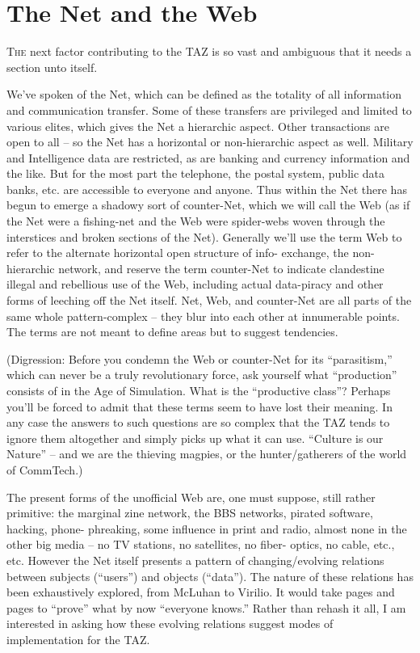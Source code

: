 \documentclass[a4paper,english,10pt,twoside]{article}
\begin{document}
\section{The Net and the Web}

\lettrine{T}{he} next factor contributing to the TAZ is so vast and ambiguous that it needs a section unto itself.

\medskip
We've spoken of the Net, which can be defined as the totality of all information and communication transfer. Some of these transfers are privileged and limited to various elites, which gives the Net a hierarchic aspect. Other transactions are open to all -- so the Net has a horizontal or non-hierarchic aspect as well. Military and Intelligence data are restricted, as are banking and currency information and the like. But for the most part the telephone, the postal system, public data banks, etc. are accessible to everyone and anyone. Thus within the Net there has begun to emerge a shadowy sort of counter-Net, which we will call the Web (as if the Net were a fishing-net and the Web were spider-webs woven through the interstices and broken sections of the Net). Generally we'll use the term Web to refer to the alternate horizontal open structure of info- exchange, the non-hierarchic network, and reserve the term counter-Net to indicate clandestine illegal and rebellious use of the Web, including actual data-piracy and other forms of leeching off the Net itself. Net, Web, and counter-Net are all parts of the same whole pattern-complex -- they blur into each other at innumerable points. The terms are not meant to define areas but to suggest tendencies.

\medskip
(Digression: Before you condemn the Web or counter-Net for its \enquote{parasitism,} which can never be a truly revolutionary force, ask yourself what \enquote{production} consists of in the Age of Simulation. What is the \enquote{productive class}? Perhaps you'll be forced to admit that these terms seem to have lost their meaning. In any case the answers to such questions are so complex that the TAZ tends to ignore them altogether and simply picks up what it can use. \enquote{Culture is our Nature} --  and we are the thieving magpies, or the hunter/gatherers of the world of CommTech.)

\medskip
The present forms of the unofficial Web are, one must suppose, still rather primitive: the marginal zine network, the BBS networks, pirated software, hacking, phone- phreaking, some influence in print and radio, almost none in the other big media -- no TV stations, no satellites, no fiber- optics, no cable, etc., etc. However the Net itself presents a pattern of changing/evolving relations between subjects (\enquote{users}) and objects (\enquote{data}). The nature of these relations has been exhaustively explored, from McLuhan to Virilio. It would take pages and pages to \enquote{prove} what by now \enquote{everyone knows.} Rather than rehash it all, I am interested in asking how these evolving relations suggest modes of implementation for the TAZ.
\end{document}
